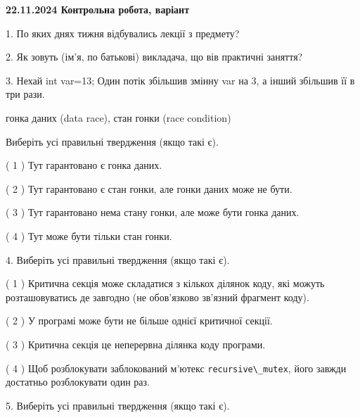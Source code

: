 \documentclass[12pt, ukrainian]{article}
\def\code#1{\Verb!#1!}
\begin{document}
\vspace{4mm}
\newpage
\begin {large}

\textbf{22.11.2024 Контрольна робота, варіант  }\par


{
1. По яких днях тижня відбувались лекції з предмету?



\vspace{5mm}
2. Як зовуть (ім'я, по батькові) викладача, що вів практичні заняття?



\vspace{5mm}
3. Нехай int var=13; Один потік збільшив змінну var на 3, а інший збільшив її в три рази.

гонка даних (data race), стан гонки (race condition)

Виберіть усі правильні твердження (якщо такі є).\par
\vspace{2mm}
( 1 ) Тут гарантовано є гонка даних.%

( 2 ) Тут гарантовано є стан гонки, але гонки даних може не бути.%

( 3 ) Тут гарантовано нема стану гонки, але може бути гонка даних.%

( 4 ) Тут може бути тільки стан гонки.%


\vspace{5mm}
4. Виберіть усі правильні твердження (якщо такі є).\par
\vspace{2mm}

( 1 ) Критична секція може складатися з кількох ділянок коду, які можуть розташовуватись де завгодно (не обов’язково зв’язний фрагмент коду).%

( 2 ) У програмі може бути не більше однієї критичної секції.%

( 3 ) Критична секція це неперервна ділянка коду програми.%

( 4 ) Щоб розблокувати заблокований м’ютекс \code{recursive\_mutex}, його завжди достатньо розблокувати один раз.%


\vspace{5mm}
5. Виберіть усі правильні твердження (якщо такі є).\par
\vspace{2mm}

}
\end{large}
\end{document}
